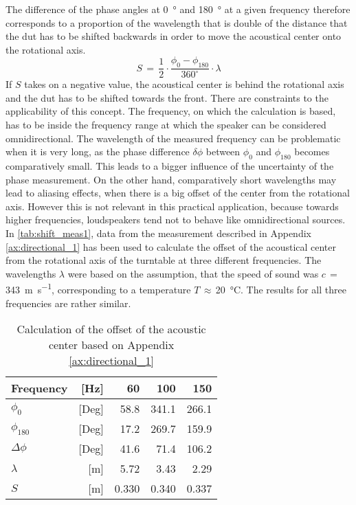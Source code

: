 The difference of the phase angles at \SI{0}{\degree} and \SI{180}{\degree} at a given frequency therefore corresponds to a proportion of the wavelength that is double of the distance that the \gls{dut} has to be shifted backwards in order to move the acoustical center onto the rotational axis.
\begin{equation}\label{eq:ac_ctr}
S\,=\,\frac{1}{2}\cdot\frac{\phi_0-\phi_{180}}{360^\circ}\cdot\lambda
\end{equation}
\startexplain
\stopexplain    
If \(S\) takes on a negative value, the acoustical center is behind the rotational axis and the \gls{dut} has to be shifted towards the front. There are constraints to the applicability of this concept. The frequency, on which the calculation is based, has to be inside the frequency range at which the speaker can be considered omnidirectional.
The wavelength of the measured frequency can be problematic when it is very long, as the phase difference \(\delta\phi\) between \(\phi_0\) and \(\phi_{180}\) becomes comparatively small. This leads to a bigger influence of the uncertainty of the phase measurement. On the other hand, comparatively short wavelengths may lead to aliasing effects, when there is a big offset of the center from the rotational axis. However this is not relevant in this practical application, because towards higher frequencies, loudspeakers tend not to behave like omnidirectional sources.\\
In \autoref{tab:shift_meas1}, data from the measurement described in Appendix \ref{ax:directional_1} has been used to calculate the offset of the acoustical center from the rotational axis of the turntable at three different frequencies. The wavelengths \(\lambda\) were based on the assumption, that the speed of sound was \(c\,=\,\)\SI{343}{\meter\per\second}, corresponding to a temperature \(T\,\approx\,\)\SI{20}{\celsius}. The results for all three frequencies are rather similar.
\begin{table}[H]
\centering
\caption{Calculation of the offset of the acoustic center based on Appendix \ref{ax:directional_1}}
\label{tab:shift_meas1}
\begin{tabular}{|lr|r|r|r|}
\hline
Frequency              & {[}Hz{]}  & 60    & 100    & 150    \\ \hline
\(\phi_0\)             & {[}Deg{]} & 58.8  & 341.1  & 266.1  \\ \hline
\(\phi_{180}\)         & {[}Deg{]} & 17.2  & 269.7  & 159.9  \\ \hline
\(\Delta\phi\)         & {[}Deg{]} & 41.6  & 71.4   & 106.2  \\ \hline
\(\lambda\)            & {[}m{]}   & 5.72  & 3.43   & 2.29   \\ \hline
\(S\)                  & {[}m{]}   & 0.330 & 0.340  & 0.337  \\ \hline
\end{tabular}
\end{table}
